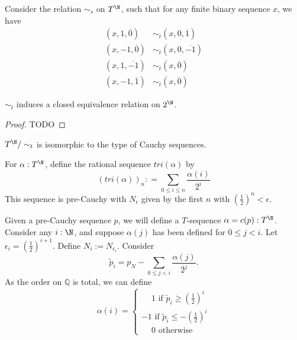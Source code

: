 Consider the relation $\sim_s$ on $T^{\N}$, 
such that for any finite binary sequence $x$, we have 
\begin{align}
  (x,1,\overline 0) &\sim_t (x ,0, \overline 1) \\
  (x,-1,\overline 0) &\sim_t (x ,0, \overline {-1})\\
  (x,1,\overline {-1}) &\sim_t (x , \overline 0) \\
  (x,-1,\overline {1}) &\sim_t (x , \overline 0) 
\end{align} 
\begin{lemma}
$\sim_t$ induces a closed equivalence relation on $2^\N$. 
\end{lemma}
\begin{proof}
  TODO
\end{proof} 

\begin{proposition}\label{propTernaryCauchy}
  $T^\N/ \sim_t$ is isomorphic to the type of Cauchy sequences. 
\end{proposition} 
\begin{definition}%
  For $\alpha: T^\N$, define the rational sequence $tri(\alpha)$ by 
  \begin{equation} (tri(\alpha))_n :  = \sum\limits_{0 \leq i \leq n} \frac{\alpha(i)} { 2^{i}} \end{equation}  
  This sequence is pre-Cauchy with $N_\epsilon$ given by the first $n$ with $(\frac12)^n<\epsilon$. 
\end{definition}  
%
\begin{definition}
  Given a pre-Cauchy sequence $p$, 
  we will define a $T$-sequence $\alpha  = c(p): T^\N$.
  Consider any $i:\N$, and suppose $\alpha(j)$ has been defined for $0 \leq j<i$. 
%
  Let $\epsilon_i = (\frac12)^{i+1}$. %
  Define $N_i:= N_{\epsilon_i}$. %
%
  Consider 
  \begin{equation}
    \widetilde p_i = p_N - \sum\limits_{0\leq j < i} \frac {\alpha(j)}{2^{j}}.
  \end{equation}
  As the order on $\mathbb Q$ is total, we can define 
  \begin{equation}
    \alpha(i) = \begin{cases}
    \phantom{-} 1  \text{ if } \widetilde p_i \geq    (\frac12)^{i} \\
    -1             \text{ if } \widetilde p_i \leq  - (\frac12)^{i} \\
    \phantom{-} 0 \text{ otherwise } 
    \end{cases} 
  \end{equation}  
\end{definition} 
